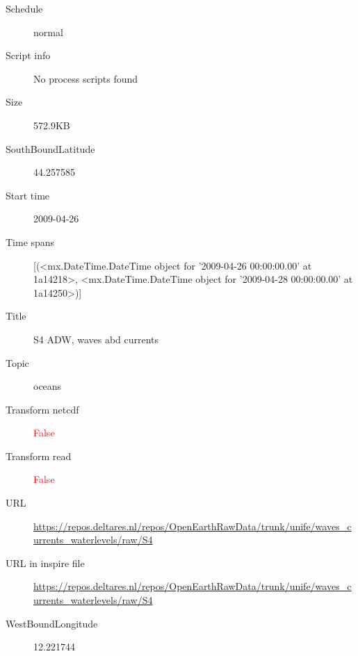 \documentclass[9]{report}
\begin{document}
\begin{description}
\begin{verbatim}
\end{verbatim}
  \item[Schedule] normal
  \item[Script info] No process scripts found
  \item[Size] 572.9KB
  \item[SouthBoundLatitude] 44.257585
  \item[Start time] 2009-04-26
  \item[Time spans] [(<mx.DateTime.DateTime object for '2009-04-26 00:00:00.00' at 1a14218>, <mx.DateTime.DateTime object for '2009-04-28 00:00:00.00' at 1a14250>)]
  \item[Title]  S4 ADW, waves abd currents 
  \item[Topic] oceans
  \item[Transform netcdf] \textcolor{red}{False}
  \item[Transform read] \textcolor{red}{False}
  \item[URL] \href{https://repos.deltares.nl/repos/OpenEarthRawData/trunk/unife/waves\_currents\_waterlevels/raw/S4}{https://repos.deltares.nl/repos/OpenEarthRawData/trunk/unife/waves\_currents\_waterlevels/raw/S4}
  \item[URL in inspire file] \href{https://repos.deltares.nl/repos/OpenEarthRawData/trunk/unife/waves\_currents\_waterlevels/raw/S4}{https://repos.deltares.nl/repos/OpenEarthRawData/trunk/unife/waves\_currents\_waterlevels/raw/S4}
  \item[WestBoundLongitude] 12.221744
\end{description}
\end{document}
